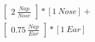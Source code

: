 \documentclass[preview]{standalone}
\begin{document}
\begin{align*}
\begin{bmatrix} 2 \ \frac{Nap}{Nose} \end{bmatrix} *  [1 \ Nose]  + \\ \begin{bmatrix} 0.75 \ \frac{Nap}{Ear} \end{bmatrix} *  [1 \ Ear]
\end{align*}
\end{document}
